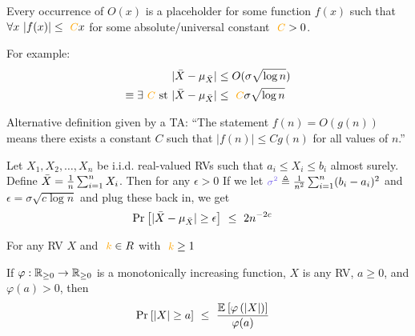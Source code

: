 \documentclass[11pt]{article}
\begin{document}
\begin{definition} 
	Every occurrence of $O(x)$ is a placeholder for some function $f(x)$ such that $\forall x ~ |f(x)| \leq \morange{C} x$ for some absolute/universal constant $\morange{C} > 0$. 
	
	For example:
	\begin{align}
		&| \bar X - \mu_{\bar X} | \leq O(\sigma \sqrt{\log n}) \\
		\equiv \exists \morange{C}  \text{ st } &|\bar X - \mu_{\bar X} | \leq \morange{C} \sigma \sqrt{\log n}
	\end{align}

	Alternative definition given by a TA: ``The statement $f(n) = O(g(n))$ means there exists a constant $C$ such that $|f(n)| \leq C g(n)$ for all values of $n$.''
\end{definition}

\begin{definition}
	Let $X_1, X_2, \ldots, X_n$ be i.i.d. real-valued RVs such that $a_i \leq X_i \leq b_i$ almost surely. Define $\bar{X} = \frac{1}{n}\sum_{i=1}^{n} X_i$. Then for any $\epsilon > 0$
	If we let $\mblue{\sigma^2} \triangleq \inv{n^2}\insum (b_i - a_i)^2$ and $\epsilon = \sigma\sqrt{c \log n}$ and plug these back in, we get
	\begin{align}
		\text{Pr}_{}\left[   |\bar{X} - \mu_{\bar X} | \geq \epsilon  \right]
			&~\leq~ 2 n^{-2c}
	\end{align}
\end{definition}

\begin{definition}
	For any RV $X$ and $\morange{k} \in R$ with $\morange{k} \geq 1$
\end{definition}

\begin{definition}
	If $\varphi: \mathbb{R}_{\geq 0} \to \mathbb{R}_{\geq 0}$ is a monotonically increasing function, $X$ is any RV, $a \geq 0$, and $\varphi (a) > 0$, then
	\begin{align}
		\text{Pr}_{}\left[ |X| \geq a \right]
			&~\leq~ \frac{  \mathbb{E}_{}\left[\varphi\left( |X| \right)\right] }{  \varphi(a) } 
	\end{align}
\end{definition}
\end{document}
